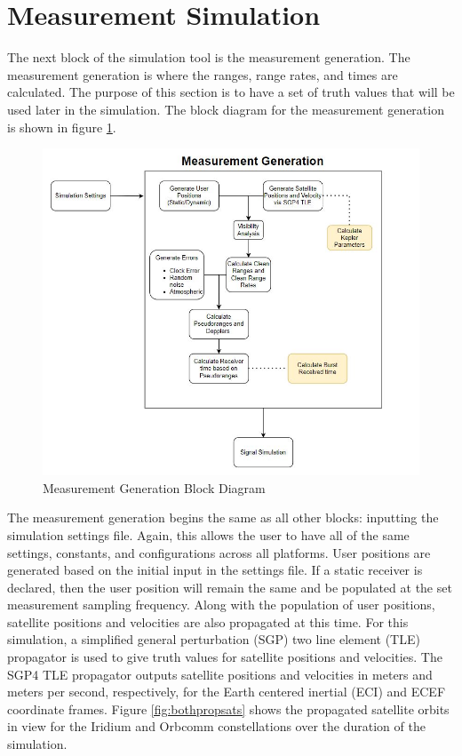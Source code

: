 \documentclass[12pt]{report}
\begin{document}
\section{Measurement Simulation}
The next block of the simulation tool is the measurement generation. The measurement generation is where the ranges, range rates, and times are calculated. The purpose of this section is to have a set of truth values that will be used later in the simulation. The block diagram for the measurement generation is shown in figure \ref{fig:MeasBlock}.

\begin{figure}[h]
    \centering
    \includegraphics[width=5in]{MeasurementGenBlockDiagram}
    \caption{Measurement Generation Block Diagram}
    \label{fig:MeasBlock}
\end{figure}

The measurement generation begins the same as all  other blocks: inputting the simulation settings file. Again, this allows the user to have all of the same settings, constants, and configurations across all platforms. User positions are generated based on the initial input in the settings file. If a static receiver is declared, then the user position will remain the same and be populated at the set measurement sampling frequency. Along with the population of user positions, satellite positions and velocities are also propagated at this time. For this simulation, a simplified general perturbation (SGP) two line element (TLE) propagator is used to give truth values for satellite positions and velocities. The SGP4 TLE propagator outputs satellite positions and velocities in meters and meters per second, respectively, for the Earth centered inertial (ECI) and ECEF coordinate frames. Figure \ref{fig:bothpropsats} shows the propagated satellite orbits in view for the Iridium and Orbcomm constellations over the duration of the simulation. 
\end{document}
